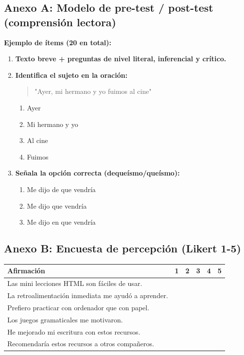 \documentclass[12pt,spanish]{article}
\begin{document}
\subsection{Anexo A: Modelo de pre-test / post-test (comprensión lectora)}

\textbf{Ejemplo de ítems (20 en total):}

\begin{enumerate}
    \item \textbf{Texto breve + preguntas de nivel literal, inferencial y crítico.}
    
    \item \textbf{Identifica el sujeto en la oración:}
    \begin{quote}
    "Ayer, mi hermano y yo fuimos al cine"
    \end{quote}
    \begin{enumerate}[label=\alph*)]
        \item Ayer
        \item Mi hermano y yo
        \item Al cine
        \item Fuimos
    \end{enumerate}
    
    \item \textbf{Señala la opción correcta (dequeísmo/queísmo):}
    \begin{enumerate}[label=\alph*)]
        \item Me dijo de que vendría
        \item Me dijo que vendría
        \item Me dijo en que vendría
    \end{enumerate}
\end{enumerate}

\subsection{Anexo B: Encuesta de percepción (Likert 1-5)}

\begin{center}
\begin{tabular}{|p{8cm}|c|c|c|c|c|}
\hline
\textbf{Afirmación} & \textbf{1} & \textbf{2} & \textbf{3} & \textbf{4} & \textbf{5} \\
\hline
Las mini lecciones HTML son fáciles de usar. & & & & & \\
\hline
La retroalimentación inmediata me ayudó a aprender. & & & & & \\
\hline
Prefiero practicar con ordenador que con papel. & & & & & \\
\hline
Los juegos gramaticales me motivaron. & & & & & \\
\hline
He mejorado mi escritura con estos recursos. & & & & & \\
\hline
Recomendaría estos recursos a otros compañeros. & & & & & \\
\hline
\end{tabular}
\end{center}
\end{document}
